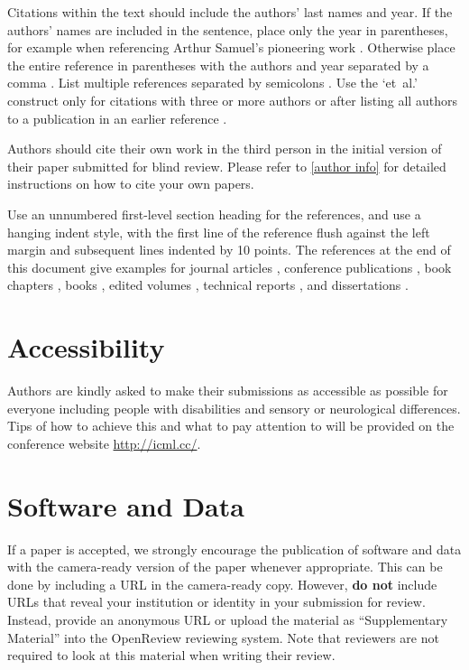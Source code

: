 \documentclass{article}
\theoremstyle{plain}
\theoremstyle{definition}
\theoremstyle{remark}
\begin{document}
Citations within the text should include the authors' last names and year. If
the authors' names are included in the sentence, place only the year in
parentheses, for example when referencing Arthur Samuel's pioneering work
. Otherwise place the entire reference in parentheses with the
authors and year separated by a comma \cite{Samuel59}. List multiple references
separated by semicolons \cite{kearns89,Samuel59,mitchell80}. Use the `et~al.'
construct only for citations with three or more authors or after listing all
authors to a publication in an earlier reference \cite{MachineLearningI}.

Authors should cite their own work in the third person in the initial version
of their paper submitted for blind review. Please refer to \cref{author info}
for detailed instructions on how to cite your own papers.

Use an unnumbered first-level section heading for the references, and use a
hanging indent style, with the first line of the reference flush against the
left margin and subsequent lines indented by 10 points. The references at the
end of this document give examples for journal articles \cite{Samuel59},
conference publications \cite{langley00}, book chapters \cite{Newell81}, books
\cite{DudaHart2nd}, edited volumes \cite{MachineLearningI}, technical reports
\cite{mitchell80}, and dissertations \cite{kearns89}.


\section*{Accessibility}

Authors are kindly asked to make their submissions as accessible as possible
for everyone including people with disabilities and sensory or neurological
differences. Tips of how to achieve this and what to pay attention to will be
provided on the conference website \url{http://icml.cc/}.

\section*{Software and Data}

If a paper is accepted, we strongly encourage the publication of software and
data with the camera-ready version of the paper whenever appropriate. This can
be done by including a URL in the camera-ready copy. However, \textbf{do not}
include URLs that reveal your institution or identity in your submission for
review. Instead, provide an anonymous URL or upload the material as
``Supplementary Material'' into the OpenReview reviewing system. Note that
reviewers are not required to look at this material when writing their review.
\end{document}
